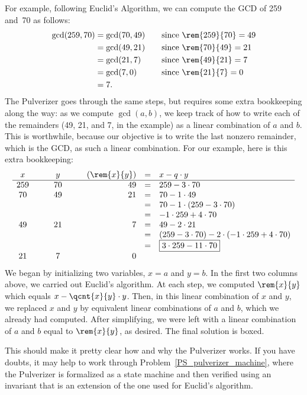 For example, following Euclid's Algorithm, we can compute the GCD of
259 and~70 as follows:
\begin{align*}
\gcd(259, 70) & = \gcd(70, 49) & \quad & \text{since $\rem{259}{70} = 49$}\\
 & = \gcd(49, 21) && \text{since $\rem{70}{49} = 21$} \\
 & = \gcd(21, 7) && \text{since $\rem{49}{21} = 7$} \\
 & = \gcd(7, 0)
                && \text{since $\rem{21}{7} = 0$} \\
 & = 7.
\end{align*}
The Pulverizer goes through the same steps, but requires some extra
bookkeeping along the way: as we compute $\gcd(a, b)$, we keep track
of how to write each of the remainders (49, 21, and 7, in the example)
as a linear combination of $a$ and $b$.  This is worthwhile, because
our objective is to write the last nonzero remainder, which is the
GCD, as such a linear combination.  For our example, here is this
extra bookkeeping:
\[
\begin{array}{ccccrcl}
x & \quad & y & \quad & (\rem{x}{y}) & = & x - q \cdot y \\
\hline
259 && 70 && 49 & = & 259 - 3 \cdot 70 \\
 70 && 49 && 21 & = & 70 - 1 \cdot 49 \\
           &&&& & = & 70 - 1 \cdot (259 - 3 \cdot 70) \\
           &&&& & = & -1 \cdot 259 + 4 \cdot 70 \\
 49 && 21 && 7  & = & 49 - 2 \cdot 21\\
           &&&& & = & (259 - 3 \cdot 70) - 2 \cdot (-1 \cdot 259 + 4 \cdot 70) \\
           &&&& & = & \fbox{$3 \cdot 259 - 11 \cdot 70$} \\
 21 && 7 && 0
\end{array}
\]
We began by initializing two variables, $x = a$ and $y = b$.  In the
first two columns above, we carried out Euclid's algorithm.  At each
step, we computed $\rem{x}{y}$ which equals $x - \qcnt{x}{y} \cdot y$.
Then, in this linear combination of $x$ and $y$, we replaced $x$ and
$y$ by equivalent linear combinations of $a$ and $b$, which we already
had computed.  After simplifying, we were left with a linear
combination of $a$ and $b$ equal to $\rem{x}{y}$, as desired.  The
final solution is boxed.

This should make it pretty clear how and why the Pulverizer works.  If
you have doubts, it may help to work through
Problem~\ref{PS_pulverizer_machine}, where the Pulverizer is
formalized as a state machine and then verified using an invariant
that is an extension of the one used for Euclid's algorithm.

